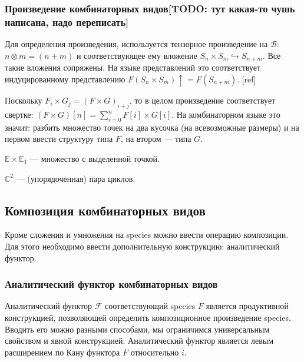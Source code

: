 \subsubsection{Произведение комбинаторных видов[TODO: тут какая-то чушь
написана, надо переписать]} Для определения произведения, используется тензорное
произведение на $\mathcal B$: $n \otimes m = (n + m)$ и соответствующее ему вложение $S_n \times S_m
\hookrightarrow S_{n+m}$. Все такие вложения сопряжены. На языке представлений
это соответствует индуцированному представлению $F(S_n \times S_m)\uparrow =
F(S_{n+m})$. [ref]

Поскольку $F_i \times G_j = (F \times G)_{i+j}$, то в целом произведение
соответствует свертке: $(F \times G)[n] = \sum\limits_{i=0}^{n}F[i] \times
G[i]$. На комбинаторном языке это значит: разбить множество точек на два кусочка
(на всевозможные размеры) и на первом ввести структуру типа $F$, на втором ---
типа $G$.
\begin{example}
$\mathbb E \times \mathbb E_1$ --- множество с выделенной точкой.
\end{example}
\begin{example}
$\mathbb C^2$ --- (упорядоченная) пара циклов.
\end{example}

\subsection{Композиция комбинаторных видов}
Кроме сложения и умножения на species можно ввести операцию композиции. Для
этого необходимо ввести дополнительную конструкцию: аналитический функтор.
\subsubsection{Аналитический функтор комбинаторных видов}
Аналитический функтор $\mathcal F$ соответствующий species $F$ является
продуктивной конструкцией, позволяющей определить композиционное произведение
species. Вводить его можно разными способами, мы ограничимся универсальным
свойством и явной конструкцией. Аналитический функтор является левым расширением по Кану функтора $F$
относительно $i$.


